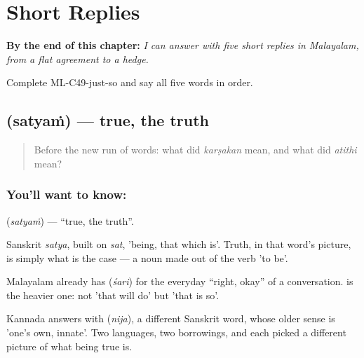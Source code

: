 
\chapter{Short Replies}
\label{ch:ml-replies}

\begin{chapteropening}
\textbf{By the end of this chapter:} \emph{I can answer with five short replies in Malayalam, from a flat agreement to a hedge.}

Complete ML-C49-just-so and say all five words in order.
\end{chapteropening}

\section[\texorpdfstring{\ml{സത്യം} (satyaṁ)}{സത്യം (satyaṁ)}]{ (satyaṁ) — true, the truth}

\label{lesson:ML-C49-true}



\begin{quote}
Before the new run of words: what did \emph{karṣakan} mean, and what did \emph{atithi} mean?
\end{quote}

\subsection*{You'll want to know: }
\textbf{} (\emph{satyaṁ}) — \textquotedblleft{}true, the truth\textquotedblright{}.

Sanskrit \emph{satya}, built on \emph{sat}, 'being, that which is'. Truth, in that word's picture, is simply what is the case — a noun made out of the verb 'to be'.

Malayalam already has  (\emph{śari}) for the everyday \textquotedblleft{}right, okay\textquotedblright{} of a conversation.  is the heavier one: not 'that will do' but 'that is so'.

Kannada answers with  (\emph{nija}), a different Sanskrit word, whose older sense is 'one's own, innate'. Two languages, two borrowings, and each picked a different picture of what being true is.

